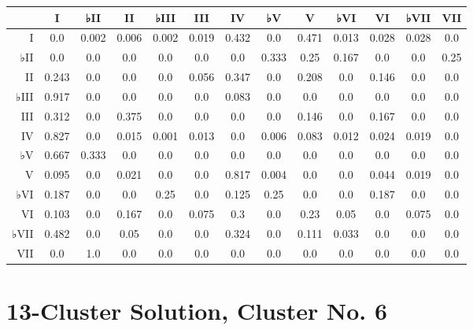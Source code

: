 \begin{table}[htbp]
\begin{minipage}{\linewidth}
\setlength{\tymax}{0.5\linewidth}
\centering
\small
\begin{tabulary}{\textwidth}{@{}RCCCCCCCCCCCC@{}} \toprule
&I&♭II&II&♭III&III&IV&♭V&V&♭VI&VI&♭VII&VII\\
\midrule
I&0.0&0.002&0.006&0.002&0.019&0.432&0.0&0.471&0.013&0.028&0.028&0.0\\
♭II&0.0&0.0&0.0&0.0&0.0&0.0&0.333&0.25&0.167&0.0&0.0&0.25\\
II&0.243&0.0&0.0&0.0&0.056&0.347&0.0&0.208&0.0&0.146&0.0&0.0\\
♭III&0.917&0.0&0.0&0.0&0.0&0.083&0.0&0.0&0.0&0.0&0.0&0.0\\
III&0.312&0.0&0.375&0.0&0.0&0.0&0.0&0.146&0.0&0.167&0.0&0.0\\
IV&0.827&0.0&0.015&0.001&0.013&0.0&0.006&0.083&0.012&0.024&0.019&0.0\\
♭V&0.667&0.333&0.0&0.0&0.0&0.0&0.0&0.0&0.0&0.0&0.0&0.0\\
V&0.095&0.0&0.021&0.0&0.0&0.817&0.004&0.0&0.0&0.044&0.019&0.0\\
♭VI&0.187&0.0&0.0&0.25&0.0&0.125&0.25&0.0&0.0&0.187&0.0&0.0\\
VI&0.103&0.0&0.167&0.0&0.075&0.3&0.0&0.23&0.05&0.0&0.075&0.0\\
♭VII&0.482&0.0&0.05&0.0&0.0&0.324&0.0&0.111&0.033&0.0&0.0&0.0\\
VII&0.0&1.0&0.0&0.0&0.0&0.0&0.0&0.0&0.0&0.0&0.0&0.0\\

\bottomrule

\end{tabulary}
\end{minipage}
\end{table}

\section{13-Cluster Solution, Cluster No. 6}
\label{13-clustersolutionclusterno.6}

